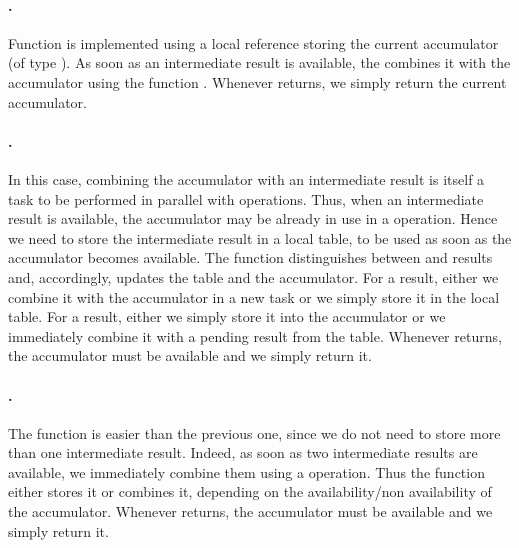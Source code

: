 \documentclass[preprint]{sigplanconf}
\begin{document}
\paragraph{.} 
Function  is implemented using a local reference
storing the current accumulator (of type ).  As soon as an
intermediate result is available, the  combines it with the
accumulator using the function . Whenever 
returns, we simply return the current accumulator.

\paragraph{.}
In this case, combining the accumulator with an intermediate result is
itself a task to be performed in parallel with  operations.
Thus, when an intermediate  result is available, the
accumulator may be already in use in a  operation. Hence we
need to store the intermediate  result in a local table, to be
used as soon as the accumulator becomes available.
The  function distinguishes between  and 
results and, accordingly, updates the table and the accumulator. For a
 result, either we combine it with the accumulator in a new
task or we simply store it in the local table. For a  result,
either we simply store it into the accumulator or we immediately
combine it with a pending  result from the table.
Whenever  returns, the accumulator must be available and
we simply return it.

\paragraph{.}
The function  is easier than the previous one, since
we do not need to store more than one intermediate result. Indeed, as
soon as two intermediate results are available, we immediately combine
them using a  operation. Thus the  function either
stores it or combines it, depending on the availability/non
availability of the accumulator.  Whenever  returns, the
accumulator must be available and we simply return it.
\end{document}

